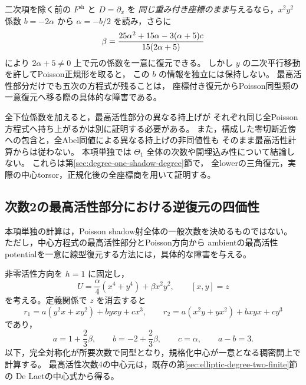 \begin{remark}[座標を固定した復元との違い]
\label{rem:degree-one-shadow-top-coordinate-inverse}
二次項を除く前の $F^{\mathrm{sh}}$ と $D=\partial_x$ を
\emph{同じ重み付き座標のまま}与えるなら，$x^2y^2$ 係数 $b=-2\alpha$ から
$\alpha=-b/2$ を読み，さらに
\[
 \beta={25\alpha^2+15\alpha-3(\alpha+5)c\over15(2\alpha+5)}
\]
により $2\alpha+5\ne0$ 上で元の係数を一意に復元できる。
しかし $y$ の二次平行移動を許してPoisson正規形を取ると，
この $b$ の情報を独立には保持しない。
最高活性部分だけでも五次の方程式が残ることは，
座標付き復元からPoisson同型類の一意復元へ移る際の具体的な障害である。

全下位係数を加えると，最高活性部分の異なる持上げが
それぞれ同じ全Poisson方程式へ持ち上がるかは別に証明する必要がある。
また，構成した零切断近傍への包含と，全Abel同値による異なる持上げの非同値性も
そのまま最高活性計算からは従わない。
本項単独では $\Theta_1$ 全体の次数や開埋込み性について結論しない。
これらは第\ref{sec:degree-one-shadow-degree}節で，
全lowerの三角復元，実際の中心torsor，正規化後の全座標商を用いて証明する。
\end{remark}

\subsection{次数2の最高活性部分における逆復元の四価性}
\label{subsec:degree-two-shadow-inverse-obstruction}

本項単独の計算は，Poisson shadow射全体の一般次数を決めるものではない。
ただし，中心方程式の最高活性部分とPoisson方向から
ambientの最高活性potentialを一意に線型復元する方法には，具体的な障害を与える。

非零活性方向を $h=1$ に固定し，
\[
 U=\frac{\alpha}{4}(x^4+y^4)+\beta x^2y^2,
 \qquad [x,y]=z
\]
を考える。定義関係で $z$ を消去すると
\[
 r_1=a(y^2x+xy^2)+byxy+cx^3,\qquad
 r_2=a(x^2y+yx^2)+bxyx+cy^3
\]
であり，
\[
 a=1+\frac23\beta,
 \qquad b=-2+\frac23\beta,
 \qquad c=\alpha,
 \qquad a-b=3.
\]
以下，完全対称化が所要次数で同型となり，規格化中心が一意となる稠密開上で計算する。
最高活性次数4の中心元は，既存の第\ref{sec:elliptic-degree-two-finite}節の
De Laetの中心式\cite[Section 5.2, Theorem 5.3]{DeLaet2017}から得る。

